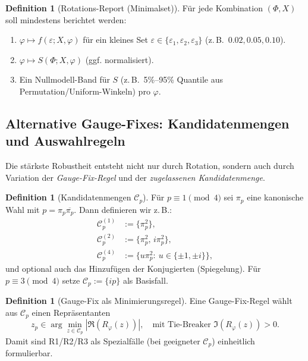 \documentclass[a4paper,11pt]{article}
\theoremstyle{definition}
\newtheorem{definition}[satz]{Definition}
\theoremstyle{remark}
\begin{document}
	\begin{definition}[Rotations-Report (Minimalset)]
		Für jede Kombination \((\Phi,X)\) soll mindestens berichtet werden:
		\begin{enumerate}
			\item \(\varphi\mapsto f(\varepsilon;X,\varphi)\) für ein kleines Set \(\varepsilon\in\{\varepsilon_1,\varepsilon_2,\varepsilon_3\}\) (z.\,B.\ \(0.02,0.05,0.10\)).
			\item \(\varphi\mapsto S(\Phi;X,\varphi)\) (ggf. normalisiert).
			\item Ein Nullmodell-Band für \(S\) (z.\,B.\ 5\%–95\% Quantile aus Permutation/Uniform-Winkeln) pro \(\varphi\).
		\end{enumerate}
	\end{definition}
	
	\subsection{Alternative Gauge-Fixes: Kandidatenmengen und Auswahlregeln}
	Die stärkste Robustheit entsteht nicht nur durch Rotation, sondern auch durch Variation der \emph{Gauge-Fix-Regel}
	und der \emph{zugelassenen Kandidatenmenge}.
	
	\begin{definition}[Kandidatenmengen \(\mathcal{C}_p\)]
		Für \(p\equiv 1\pmod 4\) sei \(\pi_p\) eine kanonische Wahl mit \(p=\pi_p\overline{\pi_p}\). Dann definieren wir z.\,B.:
		\begin{align*}
			\mathcal{C}_p^{(1)} &:= \{\pi_p^2\},\\
			\mathcal{C}_p^{(2)} &:= \{\pi_p^2,\, i\pi_p^2\},\\
			\mathcal{C}_p^{(4)} &:= \{u\pi_p^2:\ u\in\{\pm 1,\pm i\}\},
		\end{align*}
		und optional auch das Hinzufügen der Konjugierten (Spiegelung). Für \(p\equiv 3\pmod 4\) setze \(\mathcal{C}_p:=\{ip\}\) als Basisfall.
	\end{definition}
	
	\begin{definition}[Gauge-Fix als Minimierungsregel]
		Eine Gauge-Fix-Regel wählt aus \(\mathcal{C}_p\) einen Repräsentanten
		\[
		z_p \in \arg\min_{z\in\mathcal{C}_p}\left|\Re\!\left(R_\varphi(z)\right)\right|,
		\quad \text{mit Tie-Breaker } \Im\!\left(R_\varphi(z)\right)>0.
		\]
		Damit sind R1/R2/R3 als Spezialfälle (bei geeigneter \(\mathcal{C}_p\)) einheitlich formulierbar.
	\end{definition}
	
\end{document}
